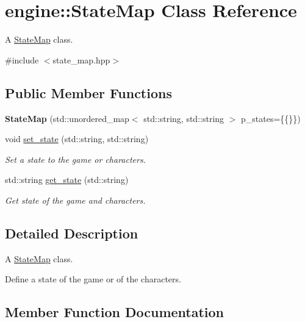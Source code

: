 \hypertarget{classengine_1_1_state_map}{}\section{engine\+:\+:State\+Map Class Reference}
\label{classengine_1_1_state_map}


A \hyperlink{classengine_1_1_state_map}{State\+Map} class.  




{\ttfamily \#include $<$state\+\_\+map.\+hpp$>$}

\subsection*{Public Member Functions}
\begin{DoxyCompactItemize}
\item 
{\bfseries State\+Map} (std\+::unordered\+\_\+map$<$ std\+::string, std\+::string $>$ p\+\_\+states=\{\{\}\})\hypertarget{classengine_1_1_state_map_a9d49650e10a07c9be8573ef118fa56c8}{}\label{classengine_1_1_state_map_a9d49650e10a07c9be8573ef118fa56c8}

\item 
void \hyperlink{classengine_1_1_state_map_a1c8cce5f3ca6a05ab4be75f88785f866}{set\+\_\+state} (std\+::string, std\+::string)
\begin{DoxyCompactList}\small\item\em Set a state to the game or characters. \end{DoxyCompactList}\item 
std\+::string \hyperlink{classengine_1_1_state_map_a05d2de75fb7d905cabca3c33fcca6d12}{get\+\_\+state} (std\+::string)
\begin{DoxyCompactList}\small\item\em Get state of the game and characters. \end{DoxyCompactList}\end{DoxyCompactItemize}


\subsection{Detailed Description}
A \hyperlink{classengine_1_1_state_map}{State\+Map} class. 

Define a state of the game or of the characters. 

\subsection{Member Function Documentation}
